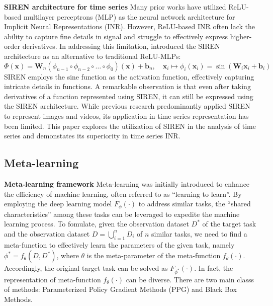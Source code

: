 \documentclass{article}
\begin{document}
\textbf{SIREN architecture for time series}
Many prior works have utilized ReLU-based multilayer perceptrons (MLP) as the neural network architecture for Implicit Neural Representations (INR). 
However, ReLU-based INR often lack the ability to capture fine details in signal and struggle to effectively express higher-order derivatives.
In addressing this limitation, \cite{sitzmann2020implicit} introduced the SIREN architecture as an alternative to traditional ReLU-MLPs:
$$
\Phi(\mathbf{x})=\mathbf{W}_n\left(\phi_{n-1} \circ \phi_{n-2} \circ \ldots \circ \phi_0\right)(\mathbf{x})+\mathbf{b}_n, \quad \mathbf{x}_i \mapsto \phi_i\left(\mathbf{x}_i\right)=\sin \left(\mathbf{W}_i \mathbf{x}_i+\mathbf{b}_i\right)
$$
SIREN employs the sine function as the activation function, effectively capturing intricate details in functions.
A remarkable observation is that even after taking derivatives of a function represented using SIREN, 
it can still be expressed using the SIREN architecture. 
While previous research predominantly applied SIREN to represent images and videos, its application in time series representation has been limited. 
This paper explores the utilization of SIREN in the analysis of time series and demonstates its superiority in time series INR.

\subsection{Meta-learning}

\textbf{Meta-learning framework}
Meta-learning was initially introduced to enhance the efficiency of machine learning, often referred to as ``learning to learn''.
By employing the deep learning model $F_\phi(\cdot)$ to address similar tasks, the ``shared characteristics'' among these tasks can be leveraged to expedite the machine learning process. 
To fomulate, given the observation dataset $D^*$ of the target task and the observation dataset $D=\bigcup_{i=1}^n D_i$ of $n$ similar tasks, we need to find a meta-function to effectively learn the parameters of the given task, namely $\phi^*=f_\theta(D,D^*)$,
where $\theta$ is the meta-parameter of the meta-function $f_\theta(\cdot)$. Accordingly, the original target task can be solved as $F_{\phi^*}(\cdot)$.
In fact, the representation of meta-function $f_\theta(\cdot)$ can be diverse. There are two main classs of methods:  Parameterized Policy Gradient Methods (PPG) and Black Box Methods.
\end{document}
